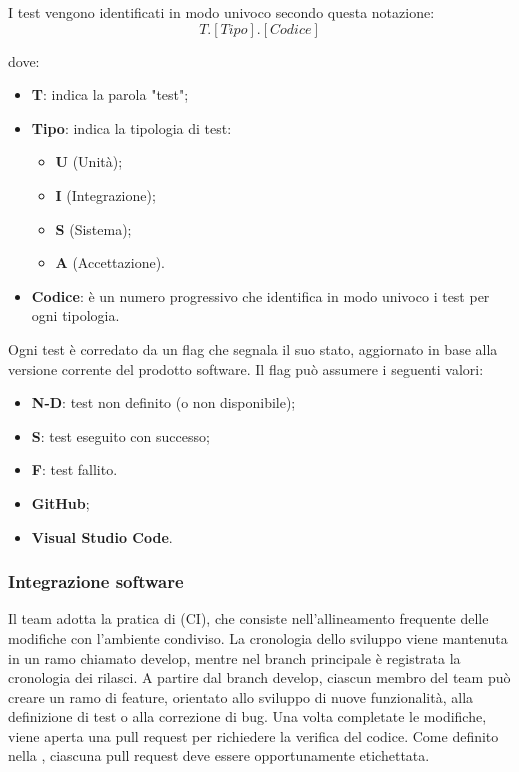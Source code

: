 \par I test vengono identificati in modo univoco secondo questa notazione: 
\[T.[Tipo].[Codice]\]
\par dove: 
\begin{itemize}
    \item \textbf{T}: indica la parola "test";
    \item \textbf{Tipo}: indica la tipologia di test: 
        \begin{itemize}
            \item \textbf{U} (Unità); 
            \item \textbf{I} (Integrazione);
            \item \textbf{S} (Sistema);
            \item \textbf{A} (Accettazione).
        \end{itemize}
    \item \textbf{Codice}: è un numero progressivo che identifica in modo univoco i test per ogni tipologia.
\end{itemize}

\par Ogni test è corredato da un flag che segnala il suo stato, aggiornato in base alla versione corrente del prodotto software. Il flag può assumere i seguenti valori:
\begin{itemize}
    \item \textbf{N-D}: test non definito (o non disponibile);
    \item \textbf{S}: test eseguito con successo;
    \item \textbf{F}: test fallito.
\end{itemize}

\begin{itemize}
  \item \textbf{GitHub};
  \item \textbf{Visual Studio Code}.
\end{itemize}

\subsubsection{Integrazione software}
\par Il team adotta la pratica di  (CI), che consiste nell’allineamento frequente delle modifiche con l’ambiente condiviso. La cronologia dello sviluppo viene mantenuta in un ramo chiamato develop, mentre nel branch principale è registrata la cronologia dei rilasci. A partire dal branch develop, ciascun membro del team può creare un ramo di feature, orientato allo sviluppo di nuove funzionalità, alla definizione di test o alla correzione di bug. Una volta completate le modifiche, viene aperta una pull request per richiedere la verifica del codice. Come definito nella , ciascuna pull request deve essere opportunamente etichettata.

